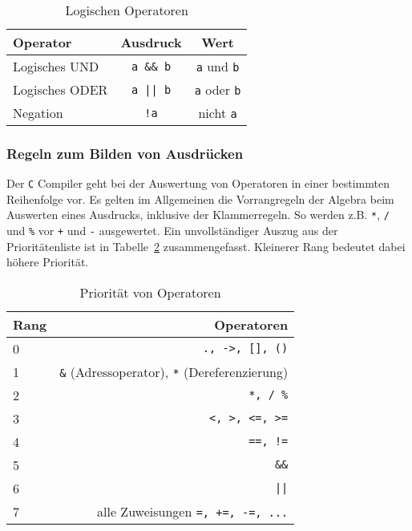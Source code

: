 \begin{table}
  \centering
  \begin{tabular}{l c c}
    \hline
    Operator & Ausdruck & Wert \\
    \hline
    Logisches UND & \verb|a && b|  &   \verb|a| und \verb|b| \\

    Logisches ODER & \verb'a || b'  &   \verb|a| oder \verb|b| \\

    Negation      & \verb|!a|      &   nicht \verb|a| \\
    \hline
  \end{tabular}
  \caption{Logischen Operatoren \label{vergoper2}}
\end{table}

\subsubsection{Regeln zum Bilden von Ausdrücken}

Der \texttt{C} Compiler geht bei der Auswertung von Operatoren in einer bestimmten Reihenfolge vor.
Es gelten im Allgemeinen die Vorrangregeln der Algebra beim Auswerten eines Ausdrucks, inklusive der Klammerregeln.
So werden z.B. \verb|*|, \verb|/| und \verb|%| vor \verb|+| und \verb|-| ausgewertet.
Ein unvollständiger Auszug aus der Prioritätenliste ist in Tabelle~\ref{tab:prior} zusammengefasst.
Kleinerer Rang bedeutet dabei höhere Priorität.

\begin{table}
  \centering
  \begin{tabular}{l r}
    \hline
    Rang & Operatoren \\
    \hline
    0 & \texttt{., ->, [], ()}\\
    1 & \texttt{\&} (Adressoperator), \texttt{*} (Dereferenzierung)\\
    2 & \texttt{*, / \%}\\
    3 & \texttt{<, >, <=, >=}\\
    4 & \texttt{==, !=}\\
    5 & \texttt{\&\&}\\
    6 & \texttt{||}\\
    7 & alle Zuweisungen \texttt{=, +=, -=, ...}\\
    \hline
  \end{tabular}
  \caption{Priorität von Operatoren}
  \label{tab:prior}
\end{table}

